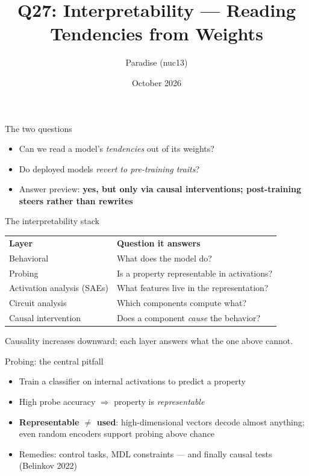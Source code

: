 \documentclass[aspectratio=169,11pt]{beamer}
\title{Q27: Interpretability --- Reading Tendencies from Weights}
\author{Paradise (nuc13)}
\date{October 2026}
\begin{document}
\frame{\titlepage}

\begin{frame}{The two questions}
\begin{itemize}
\item Can we read a model's \emph{tendencies} out of its weights?
\item Do deployed models \emph{revert to pre-training traits}?
\item Answer preview: \textbf{yes, but only via causal interventions; post-training steers rather than rewrites}
\end{itemize}
\end{frame}

\begin{frame}{The interpretability stack}
\begin{table}
\begin{tabular}{ll}
\textbf{Layer} & \textbf{Question it answers} \\
Behavioral & What does the model do? \\
Probing & Is a property representable in activations? \\
Activation analysis (SAEs) & What features live in the representation? \\
Circuit analysis & Which components compute what? \\
Causal intervention & Does a component \emph{cause} the behavior? \\
\end{tabular}
\end{table}
\vspace{0.5em}
Causality increases downward; each layer answers what the one above cannot.
\end{frame}

\begin{frame}{Probing: the central pitfall}
\begin{itemize}
\item Train a classifier on internal activations to predict a property
\item High probe accuracy $\Rightarrow$ property is \emph{representable}
\item \textbf{Representable $\neq$ used}: high-dimensional vectors decode almost anything; even random encoders support probing above chance
\item Remedies: control tasks, MDL constraints --- and finally causal tests (Belinkov 2022)
\end{itemize}
\end{frame}
\end{document}
